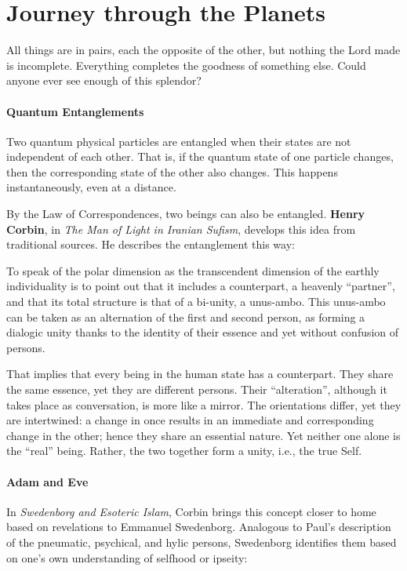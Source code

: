 \section{Journey through the Planets}

\begin{quotex}
All things are in pairs, each the opposite of the other, but nothing the Lord made is incomplete. Everything completes the goodness of something else. Could anyone ever see enough of this splendor? 

\end{quotex}
\paragraph{Quantum Entanglements}
Two quantum physical particles are entangled when their states are not independent of each other. That is, if the quantum state of one particle changes, then the corresponding state of the other also changes. This happens instantaneously, even at a distance.

By the Law of Correspondences, two beings can also be entangled. \textbf{Henry Corbin}, in \emph{The Man of Light in Iranian Sufism}, develops this idea from traditional sources. He describes the entanglement this way:

\begin{quotex}
To speak of the polar dimension as the transcendent dimension of the earthly individuality is to point out that it includes a counterpart, a heavenly “partner”, and that its total structure is that of a bi-unity, a unus-ambo. This unus-ambo can be taken as an alternation of the first and second person, as forming a dialogic unity thanks to the identity of their essence and yet without confusion of persons.

\end{quotex}
That implies that every being in the human state has a counterpart. They share the same essence, yet they are different persons. Their “alteration”, although it takes place as conversation, is more like a mirror. The orientations differ, yet they are intertwined: a change in once results in an immediate and corresponding change in the other; hence they share an essential nature. Yet neither one alone is the “real” being. Rather, the two together form a unity, i.e., the true Self.

\paragraph{Adam and Eve}
In \emph{Swedenborg and Esoteric Islam}, Corbin brings this concept closer to home based on revelations to Emmanuel Swedenborg. Analogous to Paul's description of the pneumatic, psychical, and hylic persons, Swedenborg identifies them based on one's own understanding of selfhood or ipseity:

